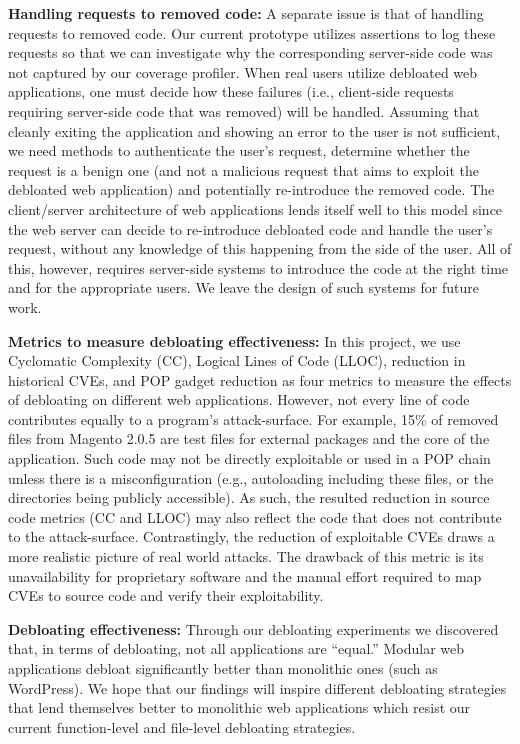 \vspace{1ex}
\noindent\textbf{Handling requests to removed code:}
A separate issue is that of handling requests to removed code. Our
current prototype utilizes assertions to log these requests so that we can
investigate why the corresponding server-side code was not captured by our
coverage profiler. When real users utilize debloated web applications,
one must decide how these failures (i.e., client-side requests requiring
server-side code that was removed) will be handled. Assuming that cleanly
exiting the application and showing an error to the user is not sufficient,
we need methods to authenticate the user's request, determine whether the
request is a benign one (and not a malicious request that aims to exploit
the debloated web application) and potentially re-introduce the removed
code. The client/server architecture of web applications lends itself well
to this model since the web server can decide to re-introduce debloated code
and handle the user's request, without any knowledge of this happening from
the side of the user. All of this, however, requires server-side systems
to introduce the code at the right time and for the appropriate users. We
leave the design of such systems for future work.

\vspace{1ex}
\noindent\textbf{Metrics to measure debloating effectiveness:}
In this project, we use Cyclomatic Complexity (CC), Logical Lines of Code
(LLOC), reduction in historical CVEs, and POP gadget reduction as four metrics to measure the
effects of debloating on different web applications. However, not every line of code
contributes equally to a program's attack-surface. For example, 15\% of removed
files from Magento 2.0.5 are test files for external packages and
the core of the application. Such code may not be directly exploitable or
used in a POP chain unless there is a misconfiguration (e.g., autoloading
including these files, or the directories being publicly accessible). As such,
the resulted reduction in source code metrics (CC and LLOC) may also reflect the code
that does not contribute to the attack-surface.
Contrastingly, the reduction of exploitable CVEs draws a more realistic picture
of real world attacks. The drawback of this metric is its unavailability for
proprietary software and the manual effort required to map CVEs to source
code and verify their exploitability.

\vspace{1ex}
\noindent\textbf{Debloating effectiveness:}
Through our debloating experiments we discovered that, in terms of debloating,
not all applications are ``equal.'' Modular web applications debloat
significantly better than monolithic ones (such as WordPress). We hope that
our findings will inspire different debloating strategies that lend themselves
better to monolithic web applications which resist our current function-level
and file-level debloating strategies.




